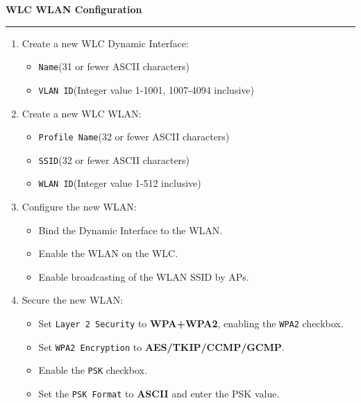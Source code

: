 \documentclass[12pt]{article}
\begin{document}
	\textbf{WLC WLAN Configuration}\hrule
	\begin{enumerate}[leftmargin=*]
		\item{Create a new WLC Dynamic Interface:}
		\begin{itemize}[leftmargin=*, itemsep=-5pt]
			\item{\texttt{Name}\hfill(31 or fewer ASCII characters)}
			\item{\texttt{VLAN ID}\hfill(Integer value 1-1001, 1007-4094 inclusive)}
		\end{itemize}
		\item{Create a new WLC WLAN:}
		\begin{itemize}[leftmargin=*, itemsep=-5pt]
			\item{\texttt{Profile Name}\hfill(32 or fewer ASCII characters)}
			\item{\texttt{SSID}\hfill(32 or fewer ASCII characters)}
			\item{\texttt{WLAN ID}\hfill(Integer value 1-512 inclusive)}
		\end{itemize}
		\item{Configure the new WLAN:}
		\begin{itemize}[leftmargin=*, itemsep=-5pt]
			\item{Bind the Dynamic Interface to the WLAN.}
			\item{Enable the WLAN on the WLC.}
			\item{Enable broadcasting of the WLAN SSID by APs.}
		\end{itemize}
		\item{Secure the new WLAN:}
		\begin{itemize}[leftmargin=*, itemsep=-5pt]
			\item{Set \texttt{Layer 2 Security} to \textbf{WPA+WPA2}, enabling the \texttt{WPA2} checkbox.}
			\item{Set \texttt{WPA2 Encryption} to \textbf{AES/TKIP/CCMP/GCMP}.}
			\item{Enable the \texttt{PSK} checkbox.}
			\item{Set the \texttt{PSK Format} to \textbf{ASCII} and enter the PSK value.}
		\end{itemize}
	\end{enumerate}

\end{document}
